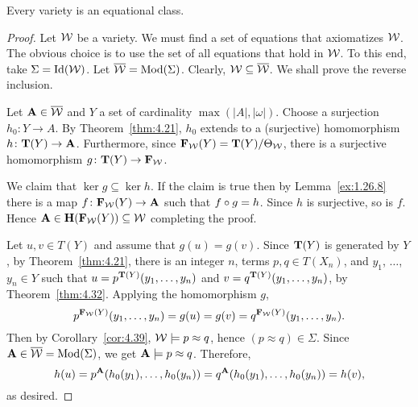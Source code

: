 \begin{theorem}
  \label{thm:4.41}
Every variety is an equational class.
\end{theorem}
\begin{proof}
Let $\mathcal{W}$ be a variety. We must find a set of equations that axiomatizes $\mathcal{W}$. 
The obvious choice is to use the set of all equations that hold in $\mathcal{W}$. 
To this end, take $\Sigma = \operatorname{Id}(\mathcal{W})$. Let $\overline{\mathcal{W}} = \operatorname{Mod}(\Sigma)$. 
Clearly, $\mathcal{W} \subseteq \overline{\mathcal{W}}$. We shall prove the reverse inclusion.

Let $\mathbf{A} \in \overline{\mathcal{W}}$ and $Y$ a set of cardinality $\max(|A|, |\omega|)$. 
Choose a surjection $h_0\colon Y \to A$. By Theorem~\ref{thm:4.21}, $h_0$ extends to 
a (surjective) homomorphism $h \colon \mathbf{T}(Y) \to \mathbf{A}$. Furthermore, since 
$\mathbf{F}_{\mathcal{W}}(Y) = \mathbf{T}(Y)/\Theta_{\mathcal{W}}$, there is a surjective homomorphism
$g \colon \mathbf{T}(Y) \to \mathbf{F}_{\mathcal{W}}$.

We claim that $\ker g \subseteq \ker h$. 
If the claim is true then by Lemma~\ref{ex:1.26.8} there is a map 
$f\colon \mathbf{F}_{\mathcal{W}}(Y) \to \mathbf{A}$ such that $f \circ g = h$. 
Since $h$ is surjective, so is $f$. Hence 
$\mathbf{A} \in \mathbf{H}(\mathbf{F}_{\mathcal{W}}(Y)) \subseteq \mathcal{W}$ completing the proof.

Let $u,v \in T(Y)$ and assume that $g(u) = g(v)$. 
Since $\mathbf{T}(Y)$ is generated by $Y$, by Theorem~\ref{thm:4.21}, 
there is an integer $n$, terms $p, q \in T(X_n)$, and 
$y_1$, $\dots$, $y_n \in Y$ such that $u = p^{\mathbf{T}(Y)}(y_1,\dots, y_n)$ and 
$v = q^{\mathbf{T}(Y)}(y_1,\dots, y_n)$, by Theorem~\ref{thm:4.32}. 
Applying the homomorphism $g$,
\[
 p^{\mathbf{F}_{\mathcal{W}}(Y)}(y_1,\dots, y_n) = g(u) = g(v) = 
 q^{\mathbf{F}_{\mathcal{W}}(Y)}(y_1,\dots, y_n).
 \]
 Then by Corollary~\ref{cor:4.39}, $\mathcal{W} \models p \approx q$, hence 
 $(p \approx q) \in \Sigma$. 
 Since $\mathbf{A} \in \overline{\mathcal{W}} = \operatorname{Mod}(\Sigma)$,
 we get $\mathbf{A} \models p \approx q$. Therefore, 
 \[
  h(u) = p^{\mathbf{A}}(h_0(y_1), \dots, h_0(y_n))
  = q^{\mathbf{A}}(h_0(y_1), \dots, h_0(y_n)) = h(v),
  \]
 as desired.
\end{proof}







